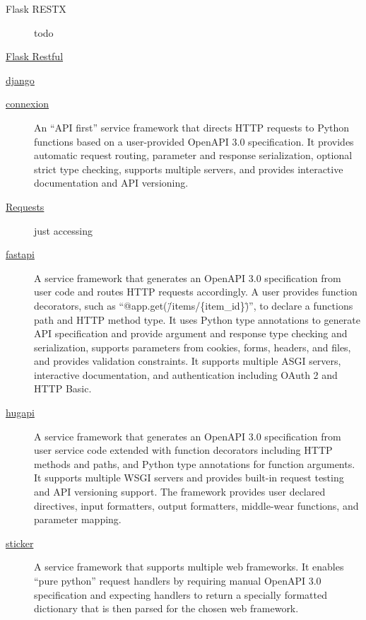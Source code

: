 \documentclass[conference]{IEEEtran}
\begin{document}
\begin{description}


\item[Flask RESTX] todo \cite{www-flaskrestx} 

\item[\href{https://flask-restful.readthedocs.io/}{Flask Restful}]
    \cite{www-flask-restful}

\item[\href{https://www.django-rest-framework.org/}{django}] \cite{www-django-rest}

\item[\href{https://github.com/zalando/connexion}{connexion}] An ``API first'' service framework that directs HTTP requests to Python functions based on a user-provided OpenAPI 3.0 specification. It provides automatic request routing, parameter and response serialization, optional strict type checking, supports multiple servers, and provides interactive documentation and API versioning. \cite{www-connexion}

\item[\href{https://requests.readthedocs.io/}{Requests}] \cite{www-python-requests}  just accessing

\item[\href{https://github.com/tiangolo/fastapi}{fastapi}] A service framework that generates an OpenAPI 3.0 specification from user code and routes HTTP requests accordingly. A user provides function decorators, such as ``@app.get(\"/items/\{item\_id\}\")'', to declare a functions path and HTTP method type. It uses Python type annotations to generate API specification and provide argument and response type checking and serialization, supports parameters from cookies, forms, headers, and files, and provides validation constraints. It supports multiple ASGI servers, interactive documentation, and authentication including OAuth 2 and HTTP Basic. \cite{www-fastapi}

\item[\href{https://github.com/hugapi/hug}{hugapi}] A service framework that generates an OpenAPI 3.0 specification from user service code extended with function decorators including HTTP methods and paths, and Python type annotations for function arguments. It supports multiple WSGI servers and provides built-in request testing and API versioning support. The framework provides user declared directives, input formatters, output formatters, middle-wear functions, and parameter mapping. \cite{www-hugapi}

\item[\href{https://github.com/rafaelcaricio/sticker}{sticker}] \cite{www-sticker} A service framework that supports multiple web frameworks. It enables ``pure python'' request handlers by requiring manual OpenAPI 3.0 specification and expecting handlers to return a specially formatted dictionary that is then parsed for the chosen web framework.


\end{description}
\end{document}
